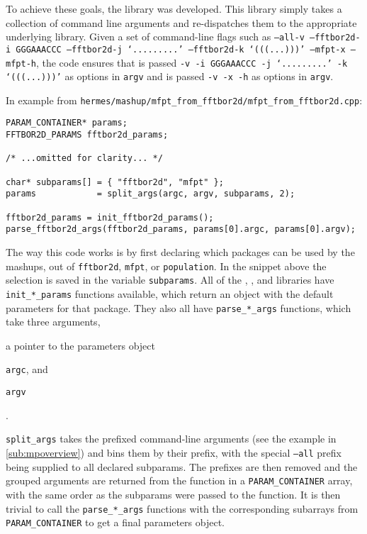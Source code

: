 \documentclass[11pt]{article}
\begin{document}
To achieve these goals, the library \multiParam was developed. This library simply takes a collection of command line arguments and re-dispatches them to the appropriate underlying library. Given a set of command-line flags such as {\tt --all-v --fftbor2d-i GGGAAACCC --fftbor2d-j `.........' --fftbor2d-k `(((...)))' --mfpt-x --mfpt-h}, the code ensures that \fft is passed {\tt -v -i GGGAAACCC -j `.........' -k `(((...)))'} as options in {\tt argv} and \rnamfpt is passed {\tt -v -x -h} as options in {\tt argv}.


In example from {\tt hermes/mashup/mfpt\_from\_fftbor2d/mfpt\_from\_fftbor2d.cpp}:

\begin{verbatim}
PARAM_CONTAINER* params;
FFTBOR2D_PARAMS fftbor2d_params;

/* ...omitted for clarity... */

char* subparams[] = { "fftbor2d", "mfpt" };
params            = split_args(argc, argv, subparams, 2);

fftbor2d_params = init_fftbor2d_params();
parse_fftbor2d_args(fftbor2d_params, params[0].argc, params[0].argv);
\end{verbatim}

The way this code works is by first declaring which packages can be used by the mashups, out of {\tt fftbor2d}, {\tt mfpt}, or {\tt population}. In the snippet above the selection is saved in the variable {\tt subparams}. All of the \fft, \rnamfpt, and \rnaeq libraries have {\tt init\_*\_params} functions available, which return an object with the default parameters for that package. They also all have {\tt parse\_*\_args} functions, which take three arguments,
\begin{inparaenum}[\itshape 1\upshape)]
\item a pointer to the parameters object
\item {\tt argc}, and
\item {\tt argv}
\end{inparaenum}.

{\tt split\_args} takes the prefixed command-line arguments (see the example in \ref{sub:mpoverview}) and bins them by their prefix, with the special {\tt --all} prefix being supplied to all declared subparams. The prefixes are then removed and the grouped arguments are returned from the function in a {\tt PARAM\_CONTAINER} array, with the same order as the subparams were passed to the function. It is then trivial to call the {\tt parse\_*\_args} functions with the corresponding subarrays from {\tt PARAM\_CONTAINER} to get a final parameters object.
\end{document}
